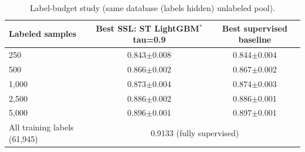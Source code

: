 \begin{table}[H]
\centering\small
\begin{tabular}{lcc}
\toprule
Labeled samples & Best SSL: ST LightGBM$^*$ tau=0.9 & Best supervised baseline\\
\midrule
250 & 0.843$\pm$0.008 & 0.844$\pm$0.004 \\
500 & 0.866$\pm$0.002 & 0.867$\pm$0.002 \\
1,000 & 0.873$\pm$0.004 & 0.874$\pm$0.003 \\
2,500 & 0.886$\pm$0.002 & 0.886$\pm$0.001 \\
5,000 & 0.896$\pm$0.001 & 0.897$\pm$0.001 \\
\midrule
All training labels (61,945) & \multicolumn{2}{c}{0.9133 (fully supervised)}\\
\bottomrule
\end{tabular}
\caption*{Label-budget study (same database (labels hidden) unlabeled pool).}
\end{table}
